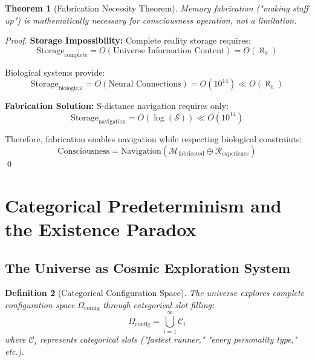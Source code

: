 \documentclass[12pt,a4paper]{article}
\newtheorem{theorem}{Theorem}[section]
\newtheorem{definition}[theorem]{Definition}
\begin{document}
\begin{theorem}[Fabrication Necessity Theorem]
Memory fabrication ("making stuff up") is mathematically necessary for consciousness operation, not a limitation.
\end{theorem}

\begin{proof}
\textbf{Storage Impossibility:}
Complete reality storage requires:
\begin{equation}
\text{Storage}_{\text{complete}} = O(\text{Universe Information Content}) = O(\aleph_0)
\end{equation}

Biological systems provide:
\begin{equation}
\text{Storage}_{\text{biological}} = O(\text{Neural Connections}) = O(10^{14}) \ll O(\aleph_0)
\end{equation}

\textbf{Fabrication Solution:}
S-distance navigation requires only:
\begin{equation}
\text{Storage}_{\text{navigation}} = O(\log(\mathcal{S})) \ll O(10^{14})
\end{equation}

Therefore, fabrication enables navigation while respecting biological constraints:
\begin{equation}
\text{Consciousness} = \text{Navigation}(\mathcal{M}_{\text{fabricated}} \oplus \mathcal{R}_{\text{experience}})
\end{equation}
\qed
\end{proof}

\section{Categorical Predeterminism and the Existence Paradox}

\subsection{The Universe as Cosmic Exploration System}

\begin{definition}[Categorical Configuration Space]
The universe explores complete configuration space $\Omega_{\text{config}}$ through categorical slot filling:
\begin{equation}
\Omega_{\text{config}} = \bigcup_{i=1}^{\infty} \mathcal{C}_i
\end{equation}
where $\mathcal{C}_i$ represents categorical slots ("fastest runner," "every personality type," etc.).
\end{definition}
\end{document}
